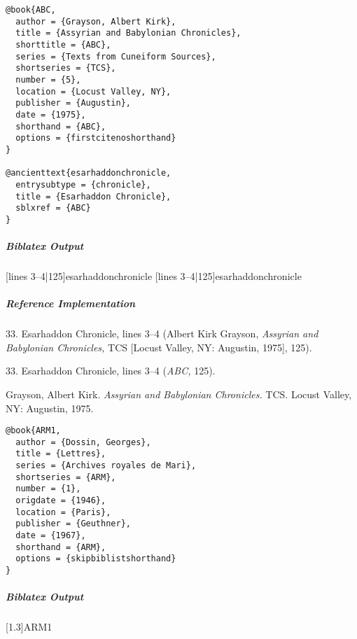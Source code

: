 \documentclass[a4paper]{article}
\newenvironment{biboutput}{%
  \subparagraph{Biblatex Output}
}{\color{black}}
\newenvironment{refimp}{%
  \subparagraph{Reference Implementation}
  \color{reference-colour}
  \rm
}{\par\color{black}}
\begin{document}
\medskip

\begin{lstlisting}
@book{ABC,
  author = {Grayson, Albert Kirk},
  title = {Assyrian and Babylonian Chronicles},
  shorttitle = {ABC},
  series = {Texts from Cuneiform Sources},
  shortseries = {TCS},
  number = {5},
  location = {Locust Valley, NY},
  publisher = {Augustin},
  date = {1975},
  shorthand = {ABC},
  options = {firstcitenoshorthand}
}

@ancienttext{esarhaddonchronicle,
  entrysubtype = {chronicle},
  title = {Esarhaddon Chronicle},
  sblxref = {ABC}
}
\end{lstlisting}

\begin{biboutput}
  [lines 3--4|125]{esarhaddonchronicle}
  [lines 3--4|125]{esarhaddonchronicle}
\end{biboutput}

\begin{refimp}
  \hspace*{\bibindent}33. Esarhaddon Chronicle, lines 3–4 (Albert Kirk
  Grayson, \emph{Assyrian and Babylonian Chronicles,} TCS [Locust Valley, NY:
  Augustin, 1975], 125).

  \hspace*{\bibindent}33. Esarhaddon Chronicle, lines 3–4 (\emph{ABC,} 125).

  \hangindent\bibindent Grayson, Albert Kirk. \emph{Assyrian and Babylonian
  Chronicles.} TCS. Locust Valley, NY: Augustin, 1975.


\end{refimp}

\medskip

\begin{lstlisting}
@book{ARM1,
  author = {Dossin, Georges},
  title = {Lettres},
  series = {Archives royales de Mari},
  shortseries = {ARM},
  number = {1},
  origdate = {1946},
  location = {Paris},
  publisher = {Geuthner},
  date = {1967},
  shorthand = {ARM},
  options = {skipbiblistshorthand}
}
\end{lstlisting}

\begin{biboutput}
  [1.3]{ARM1}
\end{biboutput}
\end{document}
